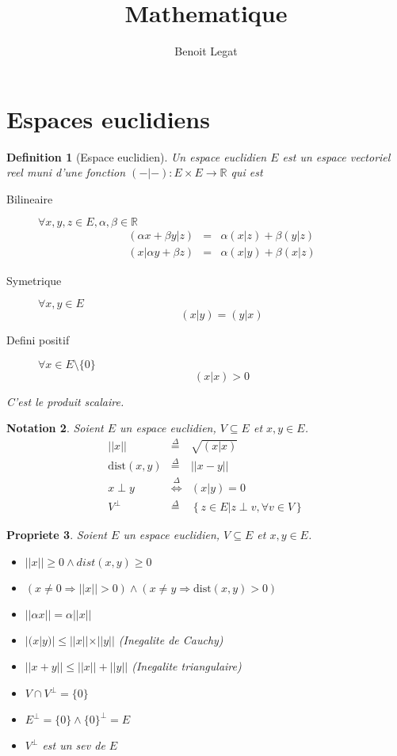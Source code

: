\documentclass[11pt,a4paper]{article} %
\title{Mathematique}
\author{Benoit Legat}
\newtheorem{defin}{Definition}[section]
\newtheorem{nota}[defin]{Notation}
\newtheorem{prop}[defin]{Propriete}
\begin{document}
\maketitle

\newcommand\dist{\mathrm{dist}}
\newcommand\Ker{\mathrm{Ker}}
\renewcommand\Im{\mathrm{Im}}

\section{Espaces euclidiens}
\begin{defin}[Espace euclidien]
	Un espace euclidien $E$ est un espace vectoriel reel muni d'une fonction
	$(-|-) : E \times E \to \mathbb{R}$ qui est
	\begin{description}
		\item[Bilineaire]
			$\forall x, y, z \in E, \alpha, \beta \in \mathbb{R}$
			\begin{eqnarray*}
				(\alpha x + \beta y | z) & = & \alpha (x | z) + \beta (y | z)\\
				(x | \alpha y + \beta z) & = & \alpha (x | y) + \beta (x | z)
			\end{eqnarray*}
		\item[Symetrique]
			$\forall x,y \in E$
			$$(x|y) = (y|x)$$
		\item[Defini positif]
			$\forall x \in E \setminus \{0\}$
			$$(x|x) > 0$$
	\end{description}
	C'est le produit scalaire.
\end{defin}

\begin{nota}
	Soient $E$ un espace euclidien, $V \subseteq E$ et $x,y \in E$.
	\begin{eqnarray*}
		||x|| & \stackrel{\Delta}{=} & \sqrt{(x|x)}\\
		\dist(x, y) & \stackrel{\Delta}{=} & ||x - y||\\
		x \perp y & \stackrel{\Delta}{\Leftrightarrow} & (x|y) = 0\\
		V^{\perp} & \stackrel{\Delta}{=} & \left\{z \in E | z \perp v, \forall v \in V\right\}
	\end{eqnarray*}
\end{nota}

\begin{prop}
	Soient $E$ un espace euclidien, $V \subseteq E$ et $x,y \in E$.
	\begin{itemize}
		\item $||x|| \geq 0 \land dist(x, y) \geq 0$
		\item $(x \neq 0 \Rightarrow ||x|| > 0) \land (x \neq y \Rightarrow \dist(x, y) > 0)$
		\item $||\alpha x|| = \alpha||x||$
		\item $|(x | y)| \leq ||x||\times||y||$ (Inegalite de Cauchy)
		\item $||x + y|| \leq ||x|| + ||y||$ (Inegalite triangulaire)
		\item $V \cap V^{\perp} = \{0\}$
		\item $E^{\perp} = \{0\} \land \{0\}^{\perp} = E$
		\item $V^{\perp}$ est un sev de $E$
	\end{itemize}
\end{prop}
\end{document}
